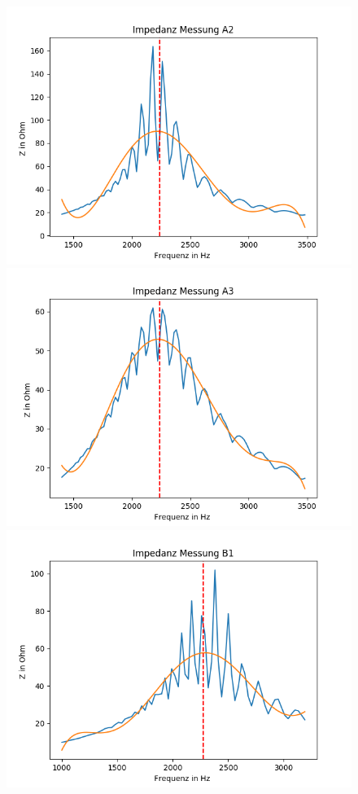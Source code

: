 \documentclass[12pt,a4paper]{article}
\begin{document}
\begin{figure}[h]
\centering
\includegraphics[scale=0.7]{Bilder/Parallel_Impedanz_2.png}
\includegraphics[scale=0.7]{Bilder/Parallel_Impedanz_3.png}
\includegraphics[scale=0.7]{Bilder/Parallel_ImpedanzB_2.png}
\end{figure}
\end{document}
